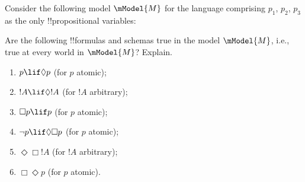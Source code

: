 \documentclass[../../../include/open-logic-section]{subfiles}
\begin{document}
\begin{prob}
  Consider the following model $\mModel{M}$ for the language
  comprising $p_1$, $p_2$, $p_3$ as the only !!{propositional variable}s:
  \begin{center}
  \end{center}
  Are the following !!{formula}s and schemas true in the model $\mModel{M}$,
  i.e., true at every world in $\mModel{M}$? Explain.
  \begin{enumerate}
  \item $p\lif \Diamond p$ (for $p$ atomic);
  \item $!A\lif \Diamond !A$ (for $!A$ arbitrary);
  \item $\Box p \lif p$ (for $p$ atomic);
  \item $\lnot p \lif \Diamond \Box p$ (for $p$ atomic);
  \item $\Diamond \Box !A$ (for $!A$ arbitrary);
  \item $\Box \Diamond p$ (for $p$ atomic). 
  \end{enumerate}
\end{prob}
\end{document}
